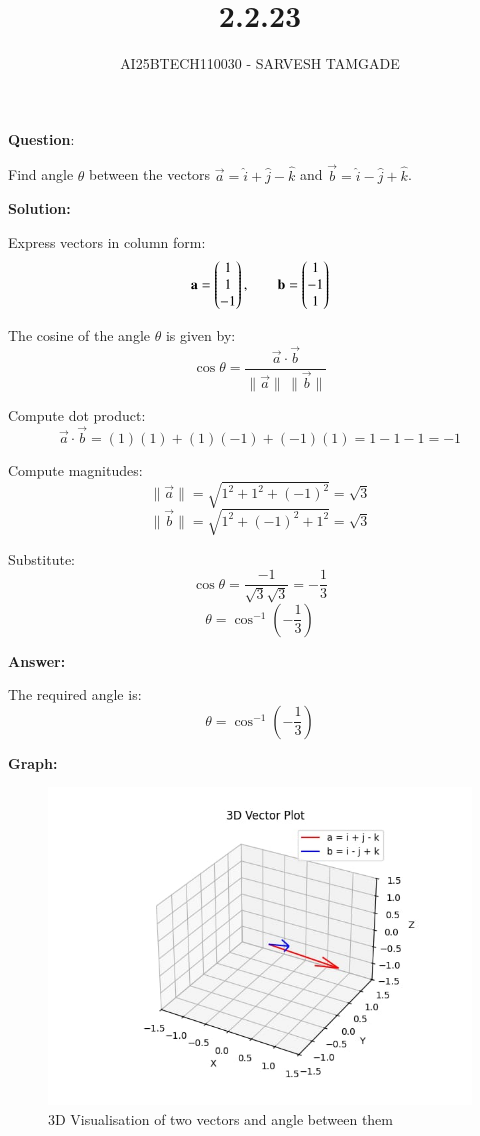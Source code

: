 \documentclass{article}
\title{2.2.23}
\author{AI25BTECH110030 - SARVESH TAMGADE}
\begin{document}
{\let\newpage\relax\maketitle}

\textbf{Question}:

Find angle \(\theta\) between the vectors \(\vec{a} = \hat{i} + \hat{j} - \hat{k}\) and \(\vec{b} = \hat{i} - \hat{j} + \hat{k}\).

\vspace{2mm}
\textbf{Solution:}

Express vectors in column form:
\[
\mathbf{a} = \begin{pmatrix}1 \\ 1 \\ -1\end{pmatrix},
\qquad
\mathbf{b} = \begin{pmatrix}1 \\ -1 \\ 1\end{pmatrix}
\]

The cosine of the angle \(\theta\) is given by:
\[
\cos\theta = \frac{\vec{a} \cdot \vec{b}}{\|\vec{a}\| \, \|\vec{b}\|}
\]

Compute dot product:
\[
\vec{a} \cdot \vec{b} = (1)(1) + (1)(-1) + (-1)(1) = 1 - 1 - 1 = -1
\]

Compute magnitudes:
\[
\|\vec{a}\| = \sqrt{1^2 + 1^2 + (-1)^2} = \sqrt{3}
\]
\[
\|\vec{b}\| = \sqrt{1^2 + (-1)^2 + 1^2} = \sqrt{3}
\]

Substitute:
\[
\cos\theta = \frac{-1}{\sqrt{3}\sqrt{3}} = -\frac{1}{3}
\]
\[
\theta = \cos^{-1}\left(-\frac{1}{3}\right)
\]

\vspace{2mm}
\textbf{Answer:}

The required angle is:
\[
\boxed{\theta = \cos^{-1}\left(-\frac{1}{3}\right)}
\]



\textbf{Graph:}
\begin{figure}[H]
	\centering
	\includegraphics[width=0.8\columnwidth]{FIG/graph.png}
	\caption{3D Visualisation of two vectors and angle between them}
	\label{img}
\end{figure}
\end{document}
